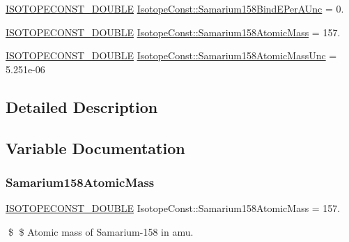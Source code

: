\begin{DoxyCompactItemize}
\mbox{\hyperlink{group___isotope_const-_macros_ga8f45a7272ce02c0b4c65c44636ed719a}{I\+S\+O\+T\+O\+P\+E\+C\+O\+N\+S\+T\+\_\+\+D\+O\+U\+B\+LE}} \mbox{\hyperlink{group___isotope_const-_samarium-_sm158_gae53db4a4b48d9e4a70ffb49257021b28}{Isotope\+Const\+::\+Samarium158\+Bind\+E\+Per\+A\+Unc}} = 0.
\item 
\mbox{\hyperlink{group___isotope_const-_macros_ga8f45a7272ce02c0b4c65c44636ed719a}{I\+S\+O\+T\+O\+P\+E\+C\+O\+N\+S\+T\+\_\+\+D\+O\+U\+B\+LE}} \mbox{\hyperlink{group___isotope_const-_samarium-_sm158_ga3fd18bf7212c0ce4819257c69e24062d}{Isotope\+Const\+::\+Samarium158\+Atomic\+Mass}} = 157.
\item 
\mbox{\hyperlink{group___isotope_const-_macros_ga8f45a7272ce02c0b4c65c44636ed719a}{I\+S\+O\+T\+O\+P\+E\+C\+O\+N\+S\+T\+\_\+\+D\+O\+U\+B\+LE}} \mbox{\hyperlink{group___isotope_const-_samarium-_sm158_ga1c4e342825024645684b3ac21d5118dc}{Isotope\+Const\+::\+Samarium158\+Atomic\+Mass\+Unc}} = 5.\+251e-\/06
\end{DoxyCompactItemize}


\subsection{Detailed Description}


\subsection{Variable Documentation}
\mbox{\label{group___isotope_const-_samarium-_sm158_ga3fd18bf7212c0ce4819257c69e24062d}} 
\subsubsection{\texorpdfstring{Samarium158\+Atomic\+Mass}{Samarium158AtomicMass}}
{\footnotesize\ttfamily \mbox{\hyperlink{group___isotope_const-_macros_ga8f45a7272ce02c0b4c65c44636ed719a}{I\+S\+O\+T\+O\+P\+E\+C\+O\+N\+S\+T\+\_\+\+D\+O\+U\+B\+LE}} Isotope\+Const\+::\+Samarium158\+Atomic\+Mass = 157.}

\$ \$ Atomic mass of Samarium-\/158 in amu. \mbox{\label{group___isotope_const-_samarium-_sm158_ga1c4e342825024645684b3ac21d5118dc}} 
